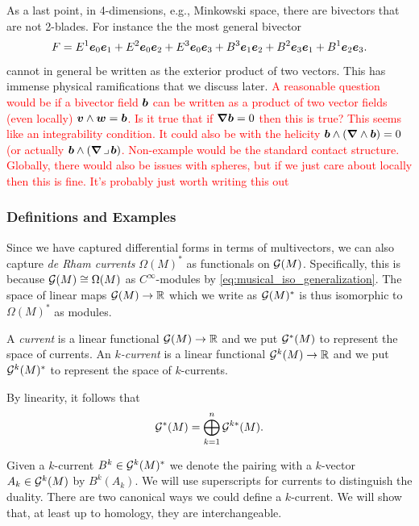 \documentclass{article}
\begin{document}
As a last point, in 4-dimensions, e.g., Minkowski space, there are bivectors that are not 2-blades. For instance the the most general bivector
\begin{equation}
    F =  E^1 \boldsymbol{e}_0 \boldsymbol{e}_1 + E^2 \boldsymbol{e}_0 \boldsymbol{e}_2 + E^3 \boldsymbol{e}_0 \boldsymbol{e}_3 + B^{3} \boldsymbol{e}_1 \boldsymbol{e}_2 + B^{2} \boldsymbol{e}_3 \boldsymbol{e}_1 + B^{1} \boldsymbol{e}_2 \boldsymbol{e}_3.
\end{equation}
cannot in general be written as the exterior product of two vectors. This has immense physical ramifications that we discuss later. \textcolor{red}{A reasonable question would be if a bivector field $\boldsymbol{b}$ can be written as a product of two vector fields (even locally) $\boldsymbol{v}\wedge \boldsymbol{w} = \boldsymbol{b}$. Is it true that if $\boldsymbol{\nabla} \boldsymbol{b}=0$ then this is true? This seems like an integrability condition. It could also be with the helicity $\boldsymbol{b} \wedge (\boldsymbol{\nabla} \wedge \boldsymbol{b})=0$ (or actually $\boldsymbol{b} \wedge (\boldsymbol{\nabla} \hspace*{.5mm}\lrcorner \hspace*{.5mm} \boldsymbol{b})$. Non-example would be the standard contact structure. Globally, there would also be issues with spheres, but if we just care about locally then this is fine. It's probably just worth writing this out}


\subsubsection{Definitions and Examples}
Since we have captured differential forms in terms of multivectors, we can also capture \emph{de Rham currents} $\Omega(M)^*$ as functionals on $\mathcal{G}(M)$. Specifically, this is because $\mathcal{G}(M)\cong \Omega(M)$ as $C^\infty$-modules by \cref{eq:musical_iso_generalization}. The space of linear maps $\mathcal{G}(M) \to \mathbb{R}$ which we write as $\mathcal{G}(M)^*$ is thus isomorphic to $\Omega(M)^*$ as modules.
\begin{definition}
A \emph{current} is a linear functional $\mathcal{G}(M) \to \mathbb{R}$ and we put $\mathcal{G}^*(M)$ to represent the space of currents. An \emph{$k$-current} is a linear functional $\mathcal{G}^k(M) \to \mathbb{R}$ and we put $\mathcal{G}^{k}(M)^*$ to represent the space of $k$-currents.
\end{definition}
By linearity, it follows that
\begin{equation}
\mathcal{G}^*(M) = \bigoplus_{k = 1}^n \mathcal{G}^{k*}(M).
\end{equation}

Given a $k$-current $B^k \in \mathcal{G}^k(M)^*$ we denote the pairing with a $k$-vector $A_k \in \mathcal{G}^k(M)$ by $B^k(A_k)$. We will use superscripts for currents to distinguish the duality. There are two canonical ways we could define a $k$-current. We will show that, at least up to homology, they are interchangeable.
\end{document}
